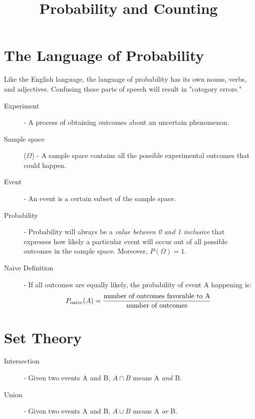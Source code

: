 \documentclass[11pt]{article}
\title{Probability and Counting}
\author{\justin}
\begin{document}
\maketitle

\begin{notes}

\section*{The Language of Probability}
Like the English language, the language of probability has its own nouns, verbs, and adjectives.  Confusing these parts of speech will result in "category errors."
\begin{description}
	\item[Experiment] - A process of obtaining outcomes about an uncertain phenomenon.

\item[Sample space] ($\Omega$) - A sample space contains all the possible experimental outcomes that could happen.

\item[Event] -  An event is a certain subset of the sample space.

\item[Probability] - Probability will always be a \textit{value between 0 and 1 inclusive} that expresses how likely a particular event will occur out of all possible outcomes in the sample space.  Moreover, $P(\Omega) = 1$.

    \item[Naive Definition] - If all outcomes are equally likely, the probability of event {A} happening is:
        \[P_{\textrm{naive}}(A) = \frac{\textnormal{number of outcomes favorable to {A}}}{\textnormal{number of outcomes}}\]

\end{description}

\section*{Set Theory}

\begin{description}
        
    \item[Intersection] - Given two events {A} and {B}, $A\cap B$ means {A} \textit{and} {B}. 
    
    \item[Union] - Given two events {A} and {B}, $A\cup B$ means {A} \textit{or} {B}. 
    

\end{description}
\end{notes}
\end{document}
